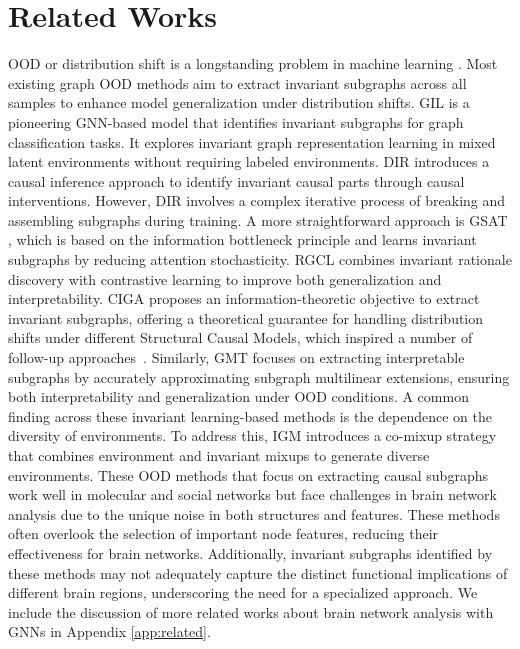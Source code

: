 \section{Related Works}

OOD or distribution shift is a longstanding problem in machine learning \citep{goyal2017accurate,zhang2018mixup,sagawa2019distributionally,krueger2021out}. Most existing graph OOD methods aim to extract invariant subgraphs across all samples to enhance model generalization under distribution shifts. GIL \citep{li2022learning} is a pioneering GNN-based model that identifies invariant subgraphs for graph classification tasks. It explores invariant graph representation learning in mixed latent environments without requiring labeled environments. DIR \citep{wu2022dir} introduces a causal inference approach to identify invariant causal parts through causal interventions. However, DIR involves a complex iterative process of breaking and assembling subgraphs during training. A more straightforward approach is GSAT \citep{miao2022interpretable}, which is based on the information bottleneck principle and learns invariant subgraphs by reducing attention stochasticity. RGCL \citep{li2022let} combines invariant rationale discovery with contrastive learning to improve both generalization and interpretability. CIGA \citep{chen2022learning} proposes an information-theoretic objective to extract invariant subgraphs, offering a theoretical guarantee for handling distribution shifts under different Structural Causal Models, which inspired a number of follow-up approaches~\citep{gala,yao2024empowering}. Similarly, GMT \citep{cheninterpretable} focuses on extracting interpretable subgraphs by accurately approximating subgraph multilinear extensions, ensuring both interpretability and generalization under OOD conditions.  A common finding across these invariant learning-based methods is the dependence on the diversity of environments. To address this, IGM \citep{jia2024graph} introduces a co-mixup strategy that combines environment and invariant mixups to generate diverse environments. These OOD methods that focus on extracting causal subgraphs work well in molecular and social networks but face challenges in brain network analysis due to the unique noise in both structures and features. These methods often overlook the selection of important node features, reducing their effectiveness for brain networks. Additionally, invariant subgraphs identified by these methods may not adequately capture the distinct functional implications of different brain regions, underscoring the need for a specialized approach. We include the discussion of more related works about brain network analysis with GNNs in Appendix \ref{app:related}.


